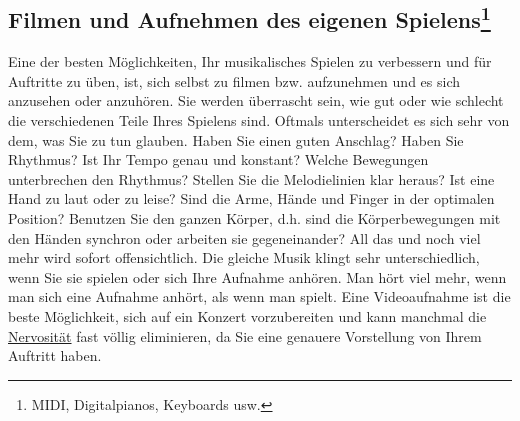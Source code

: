 
\subsection[Filmen und Aufnehmen des eigenen Spielens]{Filmen und Aufnehmen des eigenen Spielens\footnote{MIDI, Digitalpianos, Keyboards usw.}}
\label{c1iii13} 

Eine der besten Möglichkeiten, Ihr musikalisches Spielen zu verbessern und für Auftritte zu üben, ist, sich selbst zu filmen bzw. aufzunehmen und es sich anzusehen oder anzuhören.
Sie werden überrascht sein, wie gut oder wie schlecht die verschiedenen Teile Ihres Spielens sind.
Oftmals unterscheidet es sich sehr von dem, was Sie zu tun glauben.
Haben Sie einen guten Anschlag?
Haben Sie Rhythmus?
Ist Ihr Tempo genau und konstant?
Welche Bewegungen unterbrechen den Rhythmus?
Stellen Sie die Melodielinien klar heraus?
Ist eine Hand zu laut oder zu leise?
Sind die Arme, Hände und Finger in der optimalen Position?
Benutzen Sie den ganzen Körper, d.h. sind die Körperbewegungen mit den Händen synchron oder arbeiten sie gegeneinander?
All das und noch viel mehr wird sofort offensichtlich.
Die gleiche Musik klingt sehr unterschiedlich, wenn Sie sie spielen oder sich Ihre Aufnahme anhören.
Man hört viel mehr, wenn man sich eine Aufnahme anhört, als wenn man spielt.
Eine Videoaufnahme ist die beste Möglichkeit, sich auf ein Konzert vorzubereiten und kann manchmal die \hyperref[c1iii15]{Nervosität} fast völlig eliminieren, da Sie eine genauere Vorstellung von Ihrem Auftritt haben.

